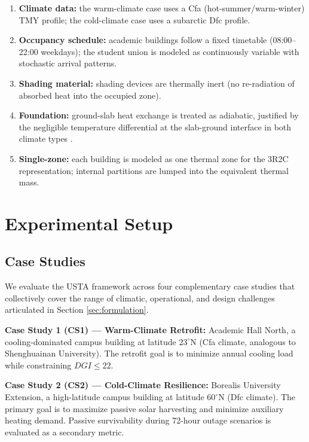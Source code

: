 \documentclass[5p,times,twocolumn]{elsarticle}
\begin{document}
\begin{enumerate}
\item \textbf{Climate data:} the warm-climate case uses a Cfa (hot-summer/warm-winter) TMY profile; the cold-climate case uses a subarctic Dfc profile.

\item \textbf{Occupancy schedule:} academic buildings follow a fixed timetable (08:00--22:00 weekdays); the student union is modeled as continuously variable with stochastic arrival patterns.

\item \textbf{Shading material:} shading devices are thermally inert (no re-radiation of absorbed heat into the occupied zone).

\item \textbf{Foundation:} ground-slab heat exchange is treated as adiabatic, justified by the negligible temperature differential at the slab-ground interface in both climate types \cite{lauster2014}.

\item \textbf{Single-zone:} each building is modeled as one thermal zone for the 3R2C representation; internal partitions are lumped into the equivalent thermal mass.
\end{enumerate}

\section{Experimental Setup}
\label{sec:setup}

\subsection{Case Studies}

We evaluate the USTA framework across four complementary case studies that collectively cover the range of climatic, operational, and design challenges articulated in Section \ref{sec:formulation}.

\textbf{Case Study 1 (CS1) --- Warm-Climate Retrofit:} Academic Hall North, a cooling-dominated campus building at latitude $23^\circ$N (Cfa climate, analogous to Shenghuainan University). The retrofit goal is to minimize annual cooling load while constraining $DGI \leq 22$.

\textbf{Case Study 2 (CS2) --- Cold-Climate Resilience:} Borealis University Extension, a high-latitude campus building at latitude $60^\circ$N (Dfc climate). The primary goal is to maximize passive solar harvesting and minimize auxiliary heating demand. Passive survivability during 72-hour outage scenarios is evaluated as a secondary metric.
\end{document}
